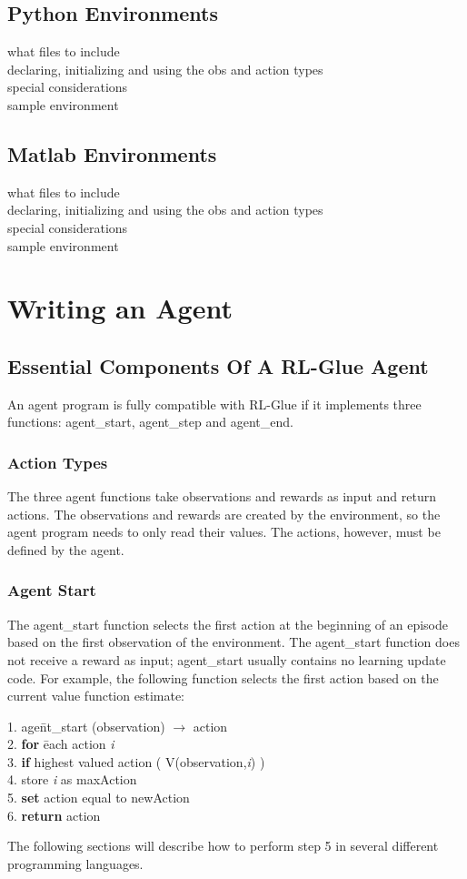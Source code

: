 \documentclass[11pt]{article}
\begin{document}
\subsection{Python Environments}
what files to include\\
declaring, initializing and using the obs and action types\\
special considerations\\
sample environment\\
\subsection{Matlab Environments}
what files to include\\
declaring, initializing and using the obs and action types\\
special considerations\\
sample environment\\


\section{Writing an Agent}
\label{agent}
\subsection{Essential Components Of A RL-Glue Agent}
An agent program is fully compatible with RL-Glue if it implements three functions: agent\_start, agent\_step and agent\_end. 

\subsubsection{Action Types}
The three agent functions take observations and rewards as input and return actions. The observations and rewards are created by the environment, so the agent program needs to only read their values. The actions, however, must be defined by the agent.

\subsubsection{Agent Start}
The agent\_start function selects the first action at the beginning of an episode based on the first observation of the environment. The agent\_start function does not receive a reward as input; agent\_start usually contains no learning update code. For example, the following function selects the first action based on the current value function estimate:
\begin{tabbing}
1. age\=nt\_start (observation) $\rightarrow$ action\\
2. \> {\bf for} \= each action {\it i}\\
3.\>\> {\bf if} highest valued action ( V(observation,{\it i}) )\\ 
4. \> store {\it i} as maxAction\\
5. \> {\bf set} action equal to newAction\\
6. {\bf return} action
\end{tabbing}
The following sections will describe how to perform step 5 in several different programming languages.
\end{document}
